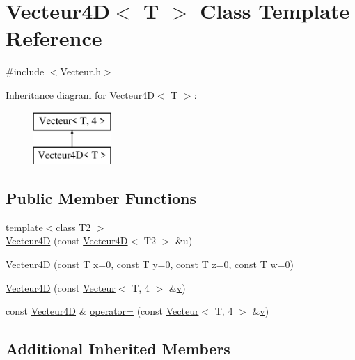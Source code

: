 \hypertarget{class_vecteur4_d}{\section{Vecteur4\-D$<$ T $>$ Class Template Reference}
\label{class_vecteur4_d}
}


{\ttfamily \#include $<$Vecteur.\-h$>$}

Inheritance diagram for Vecteur4\-D$<$ T $>$\-:\begin{figure}[H]
\begin{center}
\leavevmode
\includegraphics[height=2.000000cm]{class_vecteur4_d}
\end{center}
\end{figure}
\subsection*{Public Member Functions}
\begin{DoxyCompactItemize}
\item 
{\footnotesize template$<$class T2 $>$ }\\\hyperlink{class_vecteur4_d_abe5de951c603a937935d74741f2ff1c7}{Vecteur4\-D} (const \hyperlink{class_vecteur4_d}{Vecteur4\-D}$<$ T2 $>$ \&u)
\item 
\hyperlink{class_vecteur4_d_a4618d6ca7db2d1948857229a23d2d591}{Vecteur4\-D} (const T \hyperlink{glew_8h_ad77deca22f617d3f0e0eb786445689fc}{x}=0, const T \hyperlink{glew_8h_a9298c7ad619074f5285b32c6b72bfdea}{y}=0, const T \hyperlink{glew_8h_a826e1ac898f4ef56cea62219f74607db}{z}=0, const T \hyperlink{glew_8h_a433584688554d9a05d22844c39473968}{w}=0)
\item 
\hyperlink{class_vecteur4_d_ac5eef134308076ea67b501925b55b925}{Vecteur4\-D} (const \hyperlink{class_vecteur}{Vecteur}$<$ T, 4 $>$ \&\hyperlink{glew_8h_a6509431814422c215a65946289dd98b8}{v})
\item 
const \hyperlink{class_vecteur4_d}{Vecteur4\-D} \& \hyperlink{class_vecteur4_d_a8dc6b5c3450bf06ab168e37fbd910477}{operator=} (const \hyperlink{class_vecteur}{Vecteur}$<$ T, 4 $>$ \&\hyperlink{glew_8h_a6509431814422c215a65946289dd98b8}{v})
\end{DoxyCompactItemize}
\subsection*{Additional Inherited Members}


